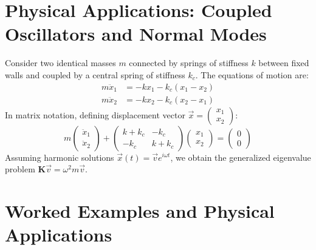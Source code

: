 \section{Physical Applications: Coupled Oscillators and Normal Modes}
Consider two identical masses $m$ connected by springs of stiffness $k$ between fixed walls and coupled by a central spring of stiffness $k_c$. The equations of motion are:
\begin{align}
m\ddot{x}_1 &= -k x_1 - k_c (x_1 - x_2) \\
m\ddot{x}_2 &= -k x_2 - k_c (x_2 - x_1)
\end{align}
In matrix notation, defining displacement vector $\vec{x} = \begin{pmatrix} x_1 \\ x_2 \end{pmatrix}$:
\begin{equation}
m\begin{pmatrix} \ddot{x}_1 \\ \ddot{x}_2 \end{pmatrix} + \begin{pmatrix} k + k_c & -k_c \\ -k_c & k + k_c \end{pmatrix} \begin{pmatrix} x_1 \\ x_2 \end{pmatrix} = \begin{pmatrix} 0 \\ 0 \end{pmatrix}
\end{equation}
Assuming harmonic solutions $\vec{x}(t) = \vec{v} e^{i\omega t}$, we obtain the generalized eigenvalue problem $\mathbf{K}\vec{v} = \omega^2 m \vec{v}$.

\section{Worked Examples and Physical Applications}

